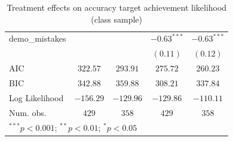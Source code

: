 \documentclass[
  12,
  letterpaper,
  DIV=11,
  numbers=noendperiod]{scrartcl}
\begin{document}
\begin{table}
{\begin{center}
\begin{tabular}{l c c c c}
demo\_mistakes          &              &              & $-0.63^{***}$ & $-0.63^{***}$ \\
                        &              &              & $(0.11)$      & $(0.12)$      \\
\hline
AIC                     & $322.57$     & $293.91$     & $275.72$      & $260.23$      \\
BIC                     & $342.88$     & $359.88$     & $308.21$      & $337.84$      \\
Log Likelihood          & $-156.29$    & $-129.96$    & $-129.86$     & $-110.11$     \\
Num. obs.               & $429$        & $358$        & $429$         & $358$         \\
\hline
\multicolumn{5}{l}{\scriptsize{$^{***}p<0.001$; $^{**}p<0.01$; $^{*}p<0.05$}}
\end{tabular}
\label{table:coefficients}
\end{center}

}

\caption{\label{tbl-reg-target-class}Treatment effects on accuracy
target achievement likelihood (class sample)}

\end{table}%
\end{document}
